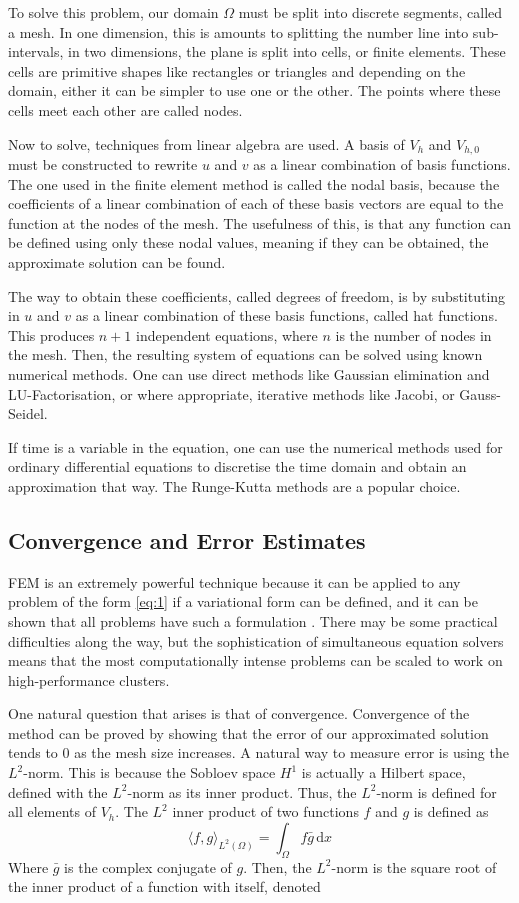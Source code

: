 To solve this problem, our domain $\Omega$ must be split into discrete segments, called a mesh. In one dimension, this is amounts to splitting the number line into sub-intervals, in two dimensions, the plane is split into cells, or finite elements. These cells are primitive shapes like rectangles or triangles and depending on the domain, either it can be simpler to use one or the other. The points where these cells meet each other are called nodes.

Now to solve, techniques from linear algebra are used. A basis of $V_h$ and $V_{h,0}$ must be constructed to rewrite $u$ and $v$ as a linear combination of basis functions. The one used in the finite element method is called the nodal basis, because the coefficients of a linear combination of each of these basis vectors are equal to the function at the nodes of the mesh. The usefulness of this, is that any function can be defined using only these nodal values, meaning if they can be obtained, the approximate solution can be found.

The way to obtain these coefficients, called degrees of freedom, is by substituting in $u$ and $v$ as a linear combination of these basis functions, called hat functions. This produces $n+1$ independent equations, where $n$ is the number of nodes in the mesh. Then, the resulting system of equations can be solved using known numerical methods. One can use direct methods like Gaussian elimination and LU-Factorisation, or where appropriate, iterative methods like Jacobi, or Gauss-Seidel.

If time is a variable in the equation, one can use the numerical methods used for ordinary differential equations to discretise the time domain and obtain an approximation that way. The Runge-Kutta methods are a popular choice.

\subsection{Convergence and Error Estimates}

FEM is an extremely powerful technique because it can be applied to any problem of the form \ref{eq:1} if a variational form can be defined, and it can be shown that all problems have such a formulation \cite{e-toni}. There may be some practical difficulties along the way, but the sophistication of simultaneous equation solvers means that the most computationally intense problems can be scaled to work on high-performance clusters.

One natural question that arises is that of convergence. Convergence of the method can be proved by showing that the error of our approximated solution tends to $0$ as the mesh size increases. A natural way to measure error is using the $L^2$-norm. This is because the Sobloev space $H^1$ is actually a Hilbert space, defined with the $L^2$-norm as its inner product. Thus, the $L^2$-norm is defined for all elements of $V_h$. The $L^2$ inner product of two functions $f$ and $g$ is defined as 
$$
\langle f, g \rangle_{L^2(\Omega)} = \int_{\Omega} f \bar{g} \, \mathrm{d}x
$$
Where $\bar{g}$ is the complex conjugate of $g$. Then, the $L^2$-norm is the square root of the inner product of a function with itself, denoted

